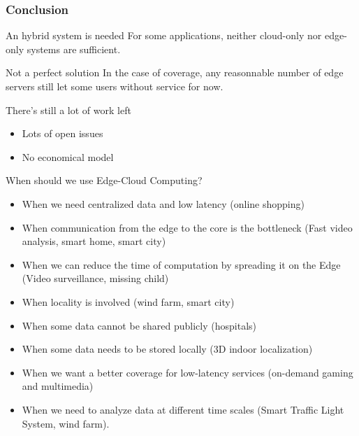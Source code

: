 \documentclass[utf8,xcolor=table, page number]{earlywinter}
\begin{document}
\begin{frame}
  \frametitle{Conclusion}

  \begin{block}{An hybrid system is needed}
    For some applications, neither cloud-only nor edge-only systems are sufficient.
  \end{block}
  
  \begin{alertblock}{Not a perfect solution}
    In the case of coverage, any reasonnable number of edge servers still let some users without service for now.
  \end{alertblock}
  
  \begin{alertblock}{There's still a lot of work left}
    \begin{itemize}
      \item Lots of open issues
      \item No economical model
    \end{itemize}
  \end{alertblock}

  
\end{frame}


\begin{frame}{When should we use Edge-Cloud Computing?}
\begin{itemize}
\item When we need centralized data and low latency (online shopping)
\item When communication from the edge to the core is the bottleneck (Fast video analysis, smart home, smart city)
\item When we can reduce the time of computation by spreading it on the Edge (Video surveillance, missing child)
\item When locality is involved (wind farm, smart city)
\item When some data cannot be shared publicly (hospitals)
\item When some data needs to be stored locally (3D indoor localization)
\item When we want a better coverage for low-latency services (on-demand gaming and multimedia)
\item When we need to analyze data at different time scales (Smart Traffic Light System, wind farm). 
\end{itemize}
\end{frame}
\end{document}

